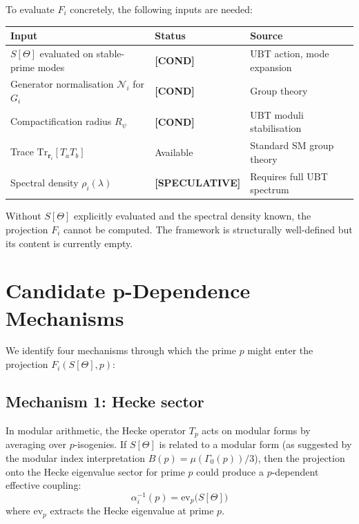 \documentclass[12pt,a4paper]{article}
\theoremstyle{definition}
\theoremstyle{remark}
\newcommand{\cond}{\textcolor{blue!65!black}{\textbf{[COND]}}}
\newcommand{\spec}{\textcolor{purple!60!black}{\textbf{[SPECULATIVE]}}}
\begin{document}
To evaluate $F_i$ concretely, the following inputs are needed:

\begin{center}
\begin{tabular}{lll}
\toprule
Input & Status & Source \\
\midrule
$S[\Theta]$ evaluated on stable-prime modes & \cond & UBT action, mode expansion \\
Generator normalisation $\mathcal{N}_i$ for $G_i$ & \cond & Group theory \\
Compactification radius $R_\psi$ & \cond & UBT moduli stabilisation \\
Trace $\mathrm{Tr}_{\mathbf{r}_i}[T_a T_b]$ & Available & Standard SM group theory \\
Spectral density $\rho_i(\lambda)$ & \spec & Requires full UBT spectrum \\
\bottomrule
\end{tabular}
\end{center}

Without $S[\Theta]$ explicitly evaluated and the spectral density known, the
projection $F_i$ cannot be computed.  The framework is structurally well-defined
but its content is currently empty.

\section{Candidate p-Dependence Mechanisms}

We identify four mechanisms through which the prime $p$ might enter the
projection $F_i(S[\Theta], p)$:

\subsection{Mechanism 1: Hecke sector}

In modular arithmetic, the Hecke operator $T_p$ acts on modular forms by
averaging over $p$-isogenies.  If $S[\Theta]$ is related to a modular form
(as suggested by the modular index interpretation $B(p) = \mu(\Gamma_0(p))/3$),
then the projection onto the Hecke eigenvalue sector for prime $p$ could
produce a $p$-dependent effective coupling:
\begin{equation}
  \alpha_i^{-1}(p) = \mathrm{ev}_p\!\bigl(S[\Theta]\bigr)
  \label{eq:hecke_projection}
\end{equation}
where $\mathrm{ev}_p$ extracts the Hecke eigenvalue at prime $p$.
\end{document}
